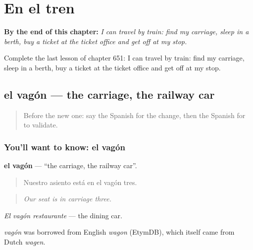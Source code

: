 
\chapter{En el tren}
\label{ch:es-en-el-tren}

\begin{chapteropening}
\textbf{By the end of this chapter:} \emph{I can travel by train: find my carriage, sleep in a berth, buy a ticket at the ticket office and get off at my stop.}

Complete the last lesson of chapter 651: I can travel by train: find my carriage, sleep in a berth, buy a ticket at the ticket office and get off at my stop.
\end{chapteropening}

\section[el vagón]{el vagón — the carriage, the railway car}

\label{lesson:ES-C651-vagon}



\begin{quote}
Before the new one: say the Spanish for the change, then the Spanish for to validate.
\end{quote}

\subsection*{You'll want to know: el vagón}
\textbf{el vagón} — \textquotedblleft{}the carriage, the railway car\textquotedblright{}.

\begin{quote}
Nuestro asiento está en el vagón tres.
\end{quote}

\begin{quote}
\emph{Our seat is in carriage three.}
\end{quote}

\emph{El vagón restaurante} — the dining car.

\begin{cousinweb}
\emph{vagón} was borrowed from English \emph{wagon} (EtymDB), which itself came from Dutch \emph{wagen}.
\end{cousinweb}

